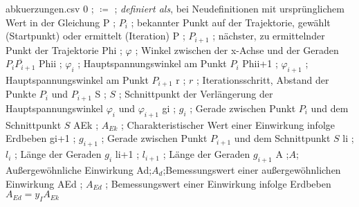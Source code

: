 \begin{filecontents*}{abkuerzungen.csv}
	0 ; $\coloneqq$ ; \textit{definiert als}, bei Neudefinitionen mit ursprünglichem Wert in der Gleichung
	P ; $P_{i}$ ; bekannter Punkt auf der Trajektorie, gewählt (Startpunkt) oder ermittelt (Iteration)
	P ; $P_{i+1}$ ; nächster, zu ermittelnder Punkt der Trajektorie
	Phi ; $\varphi$ ; Winkel zwischen der x-Achse und der Geraden $\overline{P_{i}P_{i+1}}$
	Phii ; $\varphi_{i}$ ; Hauptspannungswinkel am Punkt $P_{i}$ 
	Phii+1 ; $\varphi_{i+1}$ ; Hauptspannungswinkel am Punkt $P_{i+1}$ 
	r ; $r$ ; Iterationsschritt, Abstand der Punkte $P_{i}$ und $P_{i+1}$
	S ; $S$ ; Schnittpunkt der Verlängerung der Hauptspannungswinkel $\varphi_{i}$ und $\varphi_{i+1}$
	gi ; $g_{i}$ ; Gerade zwischen Punkt $P_{i}$ und dem Schnittpunkt $S$
	AEk ; $A_{Ek}$ ; Charakteristischer Wert einer Einwirkung infolge Erdbeben
	gi+1 ; $g_{i+1}$ ; Gerade zwischen Punkt $P_{i+1}$ und dem Schnittpunkt $S$ 
	li ; $l_{i}$ ; Länge der Geraden $g_{i}$
	li+1 ; $l_{i+1}$ ; Länge der Geraden $g_{i+1}$
	A ;$A$; Außergewöhnliche Einwirkung
	Ad;$A_{d}$;Bemessungswert einer außergewöhnlichen Einwirkung
	AEd ; $A_{Ed}$ ; Bemessungswert einer Einwirkung infolge Erdbeben $A_{Ed} = y_{I}A_{Ek}$	
\end{filecontents*}
\abkuerzungsverzeichnis